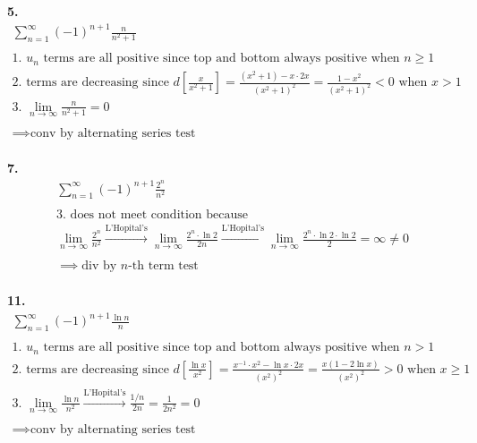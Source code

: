 \documentclass{article}
\begin{document}
\noindent
\textbf{5.}
\begin{gather*}
\sum_{n=1}^{\infty} (-1)^{n+1} \frac{n}{n^2+1}
\\
\\
\text{1. $u_n$ terms are all positive since top and bottom always positive when } n \geq 1
\\
\text{2. terms are decreasing since }
d \left[ \frac{x}{x^2+1} \right]
=\frac{(x^2+1)-x \cdot 2x}{(x^2+1)^2}
=\frac{1-x^2}{(x^2+1)^2}<0
\text{~when } x > 1
\\
\text{3. } \lim_{n \to \infty} \frac{n}{n^2+1}=0
\\
\\
\implies \text{conv by alternating series test}
\end{gather*}
\hfill
\\




\noindent
\textbf{7.}
\begin{gather*}
\sum_{n=1}^{\infty} (-1)^{n+1} \frac{2^n}{n^2}
\\
\\
\text{3. does not meet condition because}
\\
\lim_{n \to \infty} \frac{2^n}{n^2}
\xrightarrow{\text{L'Hopital's}}
\lim_{n \to \infty} \frac{2^n \cdot \ln 2}{2n}
\xrightarrow{\text{L'Hopital's}}
\lim_{n \to \infty} \frac{2^n \cdot \ln 2 \cdot \ln 2}{2}=\infty \neq 0
\\
\\
\implies \text{div by $n$-th term test}
\end{gather*}
\hfill
\\



\noindent
\textbf{11.}
\begin{gather*}
\sum_{n=1}^{\infty} (-1)^{n+1} \frac{\ln n}{n}
\\
\\
\text{1. $u_n$ terms are all positive since top and bottom always positive when } n > 1
\\
\text{2. terms are decreasing since }
d \left[ \frac{\ln x}{x^2} \right]
= \frac{x^{-1}\cdot x^2 - \ln x \cdot 2x}{(x^2)^2}
= \frac{x(1 - 2\ln x)}{(x^2)^2}>0
\text{~when } x \geq 1
\\
\text{3. } \lim_{n \to \infty} \frac{\ln n}{n^2}
\xrightarrow{\text{L'Hopital's}} \frac{1/n}{2n}=\frac{1}{2n^2}=0
\\
\\
\implies \text{conv by alternating series test}
\end{gather*}
\hfill
\\
\end{document}
